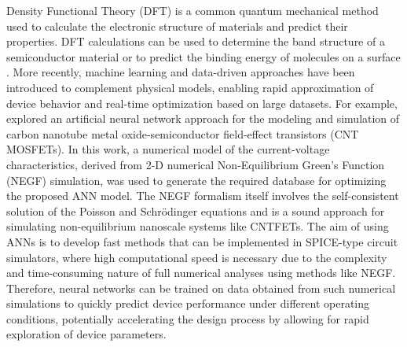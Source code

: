 Density Functional Theory (DFT) is a common quantum mechanical method used to calculate the electronic structure of materials and predict their properties. DFT calculations can be used to determine the band structure of a semiconductor material or to predict the binding energy of molecules on a surface \citep{xiaoAccurate2011}. More recently, machine learning and data-driven approaches have been introduced to complement physical models, enabling rapid approximation of device behavior and real-time optimization based on large datasets. For example, \citet{hayatiCNTMOSFET2010} explored an artificial neural network approach for the modeling and simulation of carbon nanotube metal oxide-semiconductor field-effect transistors (CNT MOSFETs).  In this work, a numerical model of the current-voltage characteristics, derived from 2-D numerical Non-Equilibrium Green's Function (NEGF) simulation, was used to generate the required database for optimizing the proposed ANN model. The NEGF formalism itself involves the self-consistent solution of the Poisson and Schrödinger equations and is a sound approach for simulating non-equilibrium nanoscale systems like CNTFETs. The aim of using ANNs is to develop fast methods that can be implemented in SPICE-type circuit simulators, where high computational speed is necessary due to the complexity and time-consuming nature of full numerical analyses using methods like NEGF. Therefore, neural networks can be trained on data obtained from such numerical simulations to quickly predict device performance under different operating conditions, potentially accelerating the design process by allowing for rapid exploration of device parameters.

